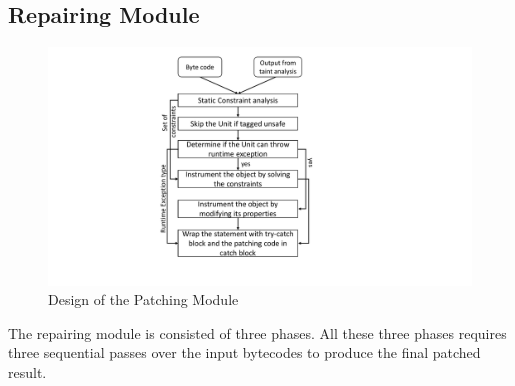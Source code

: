 \subsection{Repairing Module}
\label{subsec:RepairingModule}

\begin{figure}[t]
\centering
  \includegraphics[scale= .4]{images/PatchModule.pdf}
  \caption{Design of the Patching Module}
  \label{fig:PatchModule}
\end{figure}

The repairing module is consisted of three phases. All these three phases
requires three sequential passes over the input bytecodes to produce the final
patched result.